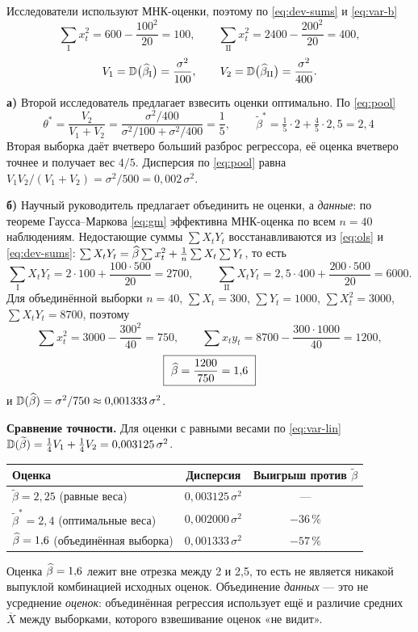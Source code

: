 \begin{solution}
Исследователи используют МНК-оценки, поэтому по \eqref{eq:dev-sums} и
\eqref{eq:var-b}
\[
  \sum_{\mathrm{I}} x_t^2 = 600 - \frac{100^2}{20} = 100,
  \qquad
  \sum_{\mathrm{II}} x_t^2 = 2400 - \frac{200^2}{20} = 400,
\]
\[
  V_1 = \mathbb{D}\bigl(\widehat{\beta}_{\mathrm{I}}\bigr) = \frac{\sigma^2}{100},
  \qquad
  V_2 = \mathbb{D}\bigl(\widehat{\beta}_{\mathrm{II}}\bigr) = \frac{\sigma^2}{400}.
\]

\medskip
\textbf{а)} Второй исследователь предлагает взвесить оценки оптимально. По
\eqref{eq:pool}
\[
  \theta^{*} = \frac{V_2}{V_1 + V_2} = \frac{\sigma^2/400}{\sigma^2/100 + \sigma^2/400}
             = \frac{1}{5},
  \qquad
  \boxed{\ \widetilde{\beta}^{*} = \tfrac{1}{5}\cdot 2 + \tfrac{4}{5}\cdot 2{,}5 = 2{,}4\ }
\]
Вторая выборка даёт вчетверо больший разброс регрессора, её оценка вчетверо
точнее и получает вес $4/5$. Дисперсия по \eqref{eq:pool} равна
$V_1V_2/(V_1+V_2) = \sigma^2/500 = 0{,}002\,\sigma^2$.

\medskip
\textbf{б)} Научный руководитель предлагает объединить не оценки, а \emph{данные}:
по теореме Гаусса--Маркова \eqref{eq:gm} эффективна МНК-оценка по всем
$n = 40$ наблюдениям. Недостающие суммы $\sum X_tY_t$ восстанавливаются из
\eqref{eq:ols} и \eqref{eq:dev-sums}: $\sum X_tY_t = \widehat{\beta}\sum x_t^2 + \frac{1}{n}\sum X_t\sum Y_t$,
то есть
\[
  \sum_{\mathrm{I}} X_tY_t = 2\cdot 100 + \frac{100\cdot 500}{20} = 2700,
  \qquad
  \sum_{\mathrm{II}} X_tY_t = 2{,}5\cdot 400 + \frac{200\cdot 500}{20} = 6000 .
\]
Для объединённой выборки $n = 40$, $\sum X_t = 300$, $\sum Y_t = 1000$,
$\sum X_t^2 = 3000$, $\sum X_tY_t = 8700$, поэтому
\[
  \sum x_t^2 = 3000 - \frac{300^2}{40} = 750,
  \qquad
  \sum x_ty_t = 8700 - \frac{300\cdot 1000}{40} = 1200,
\]
\[
  \boxed{\ \bh = \frac{1200}{750} = 1{,}6\ }
\]
и $\mathbb{D}(\widehat{\beta}) = \sigma^2/750 \approx 0{,}001333\,\sigma^2$.

\medskip
\textbf{Сравнение точности.} Для оценки с равными весами по \eqref{eq:var-lin}
$\mathbb{D}(\widetilde{\beta}) = \tfrac14 V_1 + \tfrac14 V_2 = 0{,}003125\,\sigma^2$.
\begin{center}
\begin{tabular}{lcc}
\toprule
Оценка & Дисперсия & Выигрыш против $\widetilde{\beta}$ \\
\midrule
$\widetilde{\beta} = 2{,}25$ (равные веса) & $0{,}003125\,\sigma^2$ & --- \\
$\widetilde{\beta}^{*} = 2{,}4$ (оптимальные веса) & $0{,}002000\,\sigma^2$ & $-36\,\%$ \\
$\widehat{\beta} = 1{,}6$ (объединённая выборка) & $0{,}001333\,\sigma^2$ & $-57\,\%$ \\
\bottomrule
\end{tabular}
\end{center}

\begin{remark}
Оценка $\widehat{\beta} = 1{,}6$ лежит вне отрезка между 2 и 2,5, то есть не является
никакой выпуклой комбинацией исходных оценок. Объединение \emph{данных} — это не
усреднение \emph{оценок}: объединённая регрессия использует ещё и различие
средних $\overline{X}$ между выборками, которого взвешивание оценок «не видит».
\end{remark}
\end{solution}

